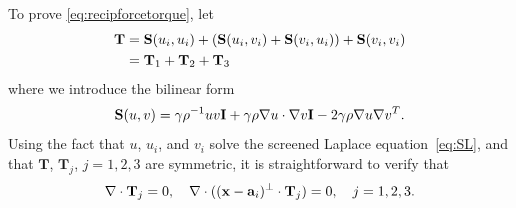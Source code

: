 \documentclass[lineno]{jfm}
\renewcommand{\aa}{\mathbf{a}}
\newcommand{\xx}{\mathbf{x}}
\begin{document}
To prove \eqref{eq:recipforcetorque}, let 
\begin{align*}
  {\bf T} &=
    \mathbf{S}(u_i,u_i)
  +(\mathbf{S}(u_i,v_i)
  +\mathbf{S}(v_i,u_i))
  +\mathbf{S}(v_i,v_i) \\
  &= {\bf T}_1 + {\bf T}_2 + {\bf T}_3
\end{align*}
where we introduce the bilinear form
\begin{equation}
\label{eq:Tsplit}
\mathbf{S}(u,v)
=  \gamma\rho^{-1} uv {\bf I} + \gamma\rho \nabla u \cdot \nabla v {\bf I} - 2 \gamma \rho \nabla u \nabla v^T .
\end{equation}
Using the fact that $u$,  $u_i$, and $v_i$ solve the screened Laplace
equation~\eqref{eq:SL},  and that $\mathbf{T}$, $\mathbf{T}_j$, $j = 1,
2, 3$ are symmetric, it is straightforward to verify that 
  \begin{equation}
    \label{eq:decompdivfree}
    \nabla \cdot {\bf T}_j = 0, \quad
    \nabla \cdot ((\xx-\aa_i)^{\perp} \cdot {\bf T}_j) = 0, \quad j = 1, 2, 3.
  \end{equation}
\end{document}
